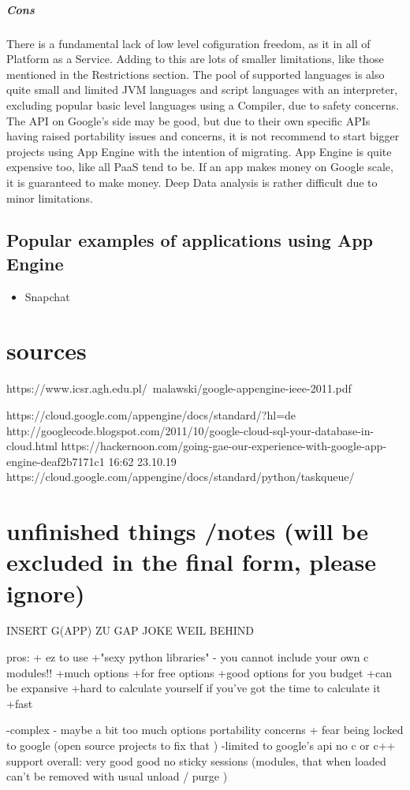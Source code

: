 \documentclass{article}
\begin{document}
\subparagraph{Cons}
There is a fundamental lack of low level cofiguration freedom, as it in all of Platform as a Service. Adding to this are lots of smaller limitations, like those mentioned in the Restrictions section. The pool of supported languages is also quite small and limited JVM languages and script languages with an interpreter, excluding popular basic level languages using a Compiler, due to safety concerns. The API on Google's side may be good, but due to their own specific APIs having raised portability issues and concerns, it is not recommend to start bigger projects using App Engine with the intention of migrating. App Engine is quite expensive too, like all PaaS tend to be. If an app makes money on Google scale, it is guaranteed to make money. Deep Data analysis is rather difficult due to minor limitations.



      \subsection{Popular examples of applications using App Engine}
	      \begin{itemize}
      	\item Snapchat
      \end{itemize} 
      
      
\section{sources}
https://www.icsr.agh.edu.pl/~malawski/google-appengine-ieee-2011.pdf

https://cloud.google.com/appengine/docs/standard/?hl=de
http://googlecode.blogspot.com/2011/10/google-cloud-sql-your-database-in-cloud.html
https://hackernoon.com/going-gae-our-experience-with-google-app-engine-deaf2b7171c1 16:62 23.10.19
https://cloud.google.com/appengine/docs/standard/python/taskqueue/

\section{unfinished things /notes (will be excluded in the final form, please ignore)}
INSERT G(APP) ZU GAP JOKE WEIL BEHIND


pros: + ez to use
+"sexy python libraries"
- you cannot include your own c modules!!
+much options
+for free options
+good options for you budget 
+can be expansive 
+hard to calculate yourself if you've got the time to calculate it
+fast

-complex
- maybe a bit too much options 
portability concerns + fear being locked to google (open source projects to fix that )
-limited to google's api
no c or c++ support 
overall: very good good
no sticky sessions (modules, that when loaded can't be removed with usual unload / purge )
\end{document}
